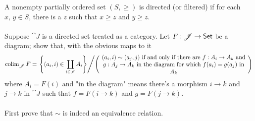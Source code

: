 \vspace*{0.1in}

\begin{problem}\label{prob 7.4}
A nonempty partially ordered set $(S, \geq)$ is directed (or filtered) if for each $x,\, y \in S$, there is a $z$ such that $x \geq z$ and $y \geq z$.\\
\\
Suppose $\cat{J}$ is a directed set treated as a category. Let $F:\mathscr{J} \to \mathsf{Set}$ be a diagram; show that, with the obvious maps to it
\[{\textstyle \colim_{\cat{J}}F} = \left.\set{(a_i,i) \in \coprod_{i\in \mathscr{I}}A_i}\middle/ \left(\parbox{25em}{\centering $(a_i, i) \sim (a_j, j)$ if and only if there are $f: A_i \to A_k$ and\\ $g: A_j \to A_k$ in the diagram for which $f(a_i) = g(a_j)$ in $A_k$}\right)\right.\]
where $A_i = F(i)$ and "in the diagram" means there's a morphism $i \to k$ and $j \to k$ in $\cat{J}$ such that $f = F(i \to k)$ and $g = F(j \to k)$.\\
\\
First prove that $\sim$ is indeed an equivalence relation. 
\end{problem}

\vspace*{0.1in}

